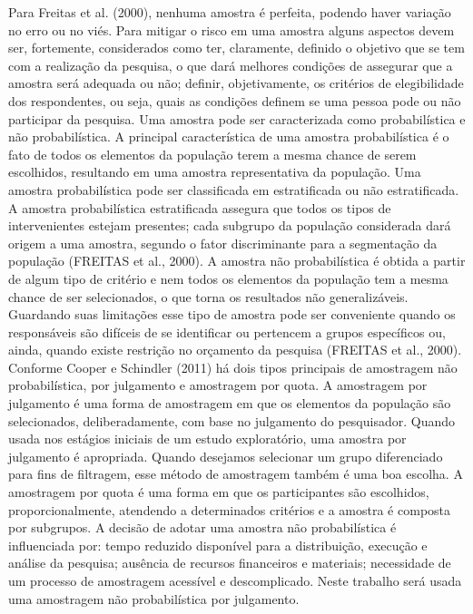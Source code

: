 Para Freitas et al. (2000), nenhuma amostra é perfeita, podendo haver variação no erro ou no viés. Para mitigar o risco em uma amostra alguns aspectos devem ser, fortemente, considerados como ter, claramente, definido o objetivo que se tem com a realização da pesquisa, o que dará melhores condições de assegurar que a amostra será adequada ou não; definir, objetivamente, os critérios de elegibilidade dos respondentes, ou seja, quais as condições definem se uma pessoa pode ou não participar da pesquisa.\newline
\indent Uma amostra pode ser caracterizada como probabilística e não probabilística. A principal característica de uma amostra probabilística é o fato de todos os elementos da população terem a mesma chance de serem escolhidos, resultando em uma amostra representativa da população. Uma amostra probabilística pode ser classificada em estratificada ou não estratificada. A amostra probabilística estratificada assegura que todos os tipos de intervenientes estejam presentes; cada subgrupo da população considerada dará origem a uma amostra, segundo o fator discriminante para a segmentação da população (FREITAS et al., 2000).\newline
\indent A amostra não probabilística é obtida a partir de algum tipo de critério e nem todos os elementos da população tem a mesma chance de ser selecionados, o que torna os resultados não generalizáveis. Guardando suas limitações esse tipo de amostra pode ser conveniente quando os responsáveis são difíceis de se identificar ou pertencem a grupos específicos ou, ainda, quando existe restrição no orçamento da pesquisa (FREITAS et al., 2000).\newline
\indent Conforme Cooper e Schindler (2011) há dois tipos principais de amostragem não probabilística, por julgamento e amostragem por quota. A amostragem por julgamento é uma forma de amostragem em que os elementos da população são selecionados, deliberadamente, com base no julgamento do pesquisador. Quando usada nos estágios iniciais de um estudo exploratório, uma amostra por julgamento é apropriada.\newline
\indent Quando desejamos selecionar um grupo diferenciado para fins de filtragem, esse método de amostragem também é uma boa escolha. A amostragem por quota é uma forma em que os participantes são escolhidos, proporcionalmente, atendendo a determinados critérios e a amostra é composta por subgrupos.\newline
\indent A decisão de adotar uma amostra não probabilística é influenciada por: tempo reduzido disponível para a distribuição, execução e análise da pesquisa; ausência de recursos financeiros e materiais; necessidade de um processo de amostragem acessível e descomplicado. Neste trabalho será usada uma amostragem não probabilística por julgamento.\newline
